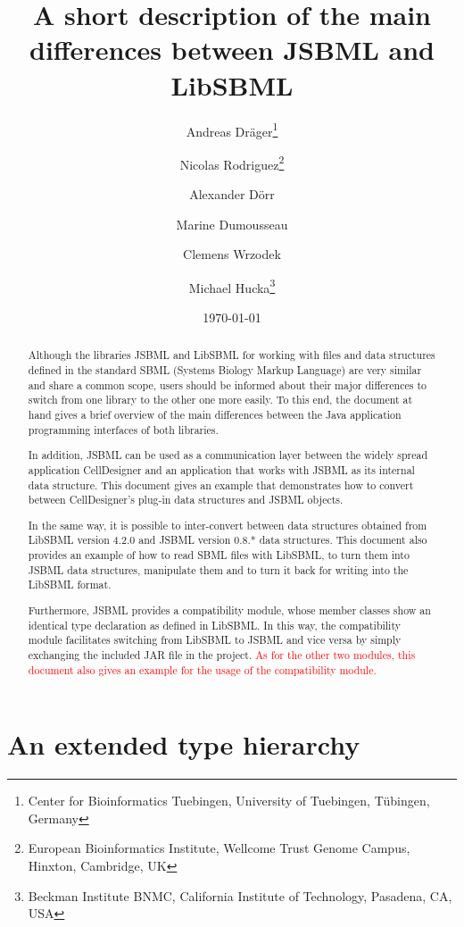 \documentclass[
  BCOR12mm,
  letterpaper,
  11pt,
  headsepline,
  pointlessnumbers,
  tablecaptionabove,
  onelinecaption,
  headinclude,
  appendixprefix,
  idxtotoc,
  bibtotoc,
  twoside,
  titlepage
]{scrartcl}
\title{A short description of the main differences between JSBML and LibSBML}
\author{Andreas Dr\"ager\thanks{Center for Bioinformatics Tuebingen, University
of Tuebingen, T\"ubingen, Germany}\and%
Nicolas Rodriguez\thanks{European Bioinformatics Institute, Wellcome Trust
Genome Campus, Hinxton, Cambridge, UK}\and%
Alexander D\"orr\footnotemark[1]\and%
Marine Dumousseau\footnotemark[2]\and%
Clemens Wrzodek\footnotemark[1]\and%
Michael Hucka\thanks{Beckman Institute BNMC, California Institute of Technology,
Pasadena, CA, USA}}
\date{\today}
\begin{document}
\maketitle
\tableofcontents

\begin{abstract}
Although the libraries JSBML and LibSBML for working with files and data
structures defined in the standard SBML (Systems Biology Markup Language) are
very similar and share a common scope, users should be informed about their
major differences to switch from one library to the other one more easily. To
this end, the document at hand gives a brief overview of the main differences
between the Java\texttrademark{} application programming interfaces of both
libraries.

In addition, JSBML can be used as a communication layer between the widely
spread application CellDesigner and an application that works with JSBML as its
internal data structure. This document gives an example that demonstrates how to
convert between CellDesigner's plug-in data structures and JSBML objects.

In the same way, it is possible to inter-convert between data structures
obtained from LibSBML version 4.2.0 and JSBML version 0.8.* data structures.
This document also provides an example of how to read SBML files with LibSBML,
to turn them into JSBML data structures, manipulate them and to turn it back for
writing into the LibSBML format.

Furthermore, JSBML provides a compatibility module, whose member classes show
an identical type declaration as defined in LibSBML. In this way, the
compatibility module facilitates switching from LibSBML to JSBML and vice versa
by simply exchanging the included JAR file in the project. \textcolor{red}{As for
the other two modules, this document also gives an example for the usage of the
compatibility module.}
\end{abstract}

\section{An extended type hierarchy}
\end{document}
